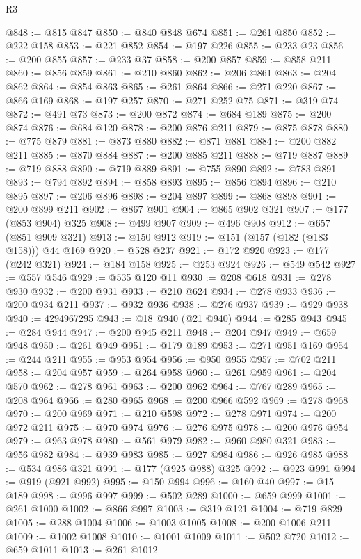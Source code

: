\begin{lexlean}{R3}
\begin{coremodule}
@848 := @815 @847
@850 := @840 @848 @674
@851 := @261 @850
@852 := @222 @158
@853 := @221 @852
@854 := @197 @226
@855 := @233 @23
@856 := @200 @855
@857 := @233 @37
@858 := @200 @857
@859 := @858 @211
@860 := @856 @859
@861 := @210 @860
@862 := @206 @861
@863 := @204 @862
@864 := @854 @863
@865 := @261 @864
@866 := @271 @220
@867 := @866 @169
@868 := @197 @257
@870 := @271 @252 @75
@871 := @319 @74
@872 := @491 @73
@873 := @200 @872
@874 := @684 @189
@875 := @200 @874
@876 := @684 @120
@878 := @200 @876 @211
@879 := @875 @878
@880 := @775 @879
@881 := @873 @880
@882 := @871 @881
@884 := @200 @882 @211
@885 := @870 @884
@887 := @200 @885 @211
@888 := @719 @887
@889 := @719 @888
@890 := @719 @889
@891 := @755 @890
@892 := @783 @891
@893 := @794 @892
@894 := @858 @893
@895 := @856 @894
@896 := @210 @895
@897 := @206 @896
@898 := @204 @897
@899 := @868 @898
@901 := @200 @899 @211
@902 := @867 @901
@904 := @865 @902 @321
@907 := @177 (@853 @904) @325
@908 := @499 @907
@909 := @496 @908
@912 := @657 (@851 @909 @321)
@913 := @150 @912
@919 := @151 (@157 (@182 (@183 @158))) @44 @169
@920 := @528 @237
@921 := @172 @920
@923 := @177 (@242 @321)
@924 := @184 @158
@925 := @253 @924
@926 := @549 @542
@927 := @557 @546
@929 := @535 @120 @11
@930 := @208 @618
@931 := @278 @930
@932 := @200 @931
@933 := @210 @624
@934 := @278 @933
@936 := @200 @934 @211
@937 := @932 @936
@938 := @276 @937
@939 := @929 @938
@940 := 4294967295
@943 := @18 @940 (@21 @940)
@944 := @285 @943
@945 := @284 @944
@947 := @200 @945 @211
@948 := @204 @947
@949 := @659 @948
@950 := @261 @949
@951 := @179 @189
@953 := @271 @951 @169
@954 := @244 @211
@955 := @953 @954
@956 := @950 @955
@957 := @702 @211
@958 := @204 @957
@959 := @264 @958
@960 := @261 @959
@961 := @204 @570
@962 := @278 @961
@963 := @200 @962
@964 := @767 @289
@965 := @208 @964
@966 := @280 @965
@968 := @200 @966 @592
@969 := @278 @968
@970 := @200 @969
@971 := @210 @598
@972 := @278 @971
@974 := @200 @972 @211
@975 := @970 @974
@976 := @276 @975
@978 := @200 @976 @954
@979 := @963 @978
@980 := @561 @979
@982 := @960 @980 @321
@983 := @956 @982
@984 := @939 @983
@985 := @927 @984
@986 := @926 @985
@988 := @534 @986 @321
@991 := @177 (@925 @988) @325
@992 := @923 @991
@994 := @919 (@921 @992)
@995 := @150 @994
@996 := @160 @40
@997 := @15 @189
@998 := @996 @997
@999 := @502 @289
@1000 := @659 @999
@1001 := @261 @1000
@1002 := @866 @997
@1003 := @319 @121
@1004 := @719 @829
@1005 := @288 @1004
@1006 := @1003 @1005
@1008 := @200 @1006 @211
@1009 := @1002 @1008
@1010 := @1001 @1009
@1011 := @502 @720
@1012 := @659 @1011
@1013 := @261 @1012

\end{coremodule}
\end{lexlean}
